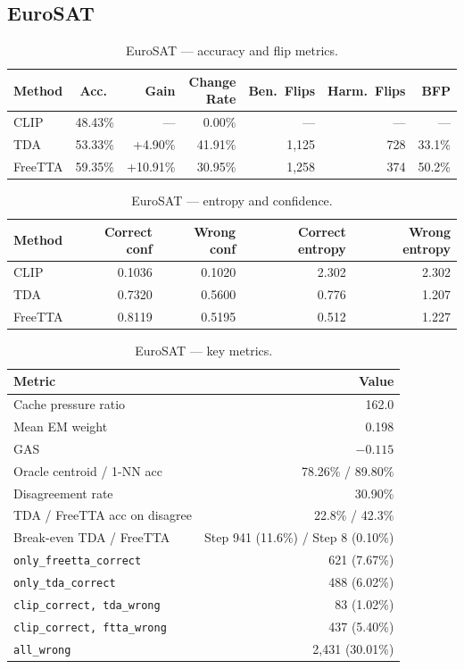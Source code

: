\documentclass[12pt,a4paper]{article}
\newcommand{\1}{\mathbf{1}}
\begin{document}
\subsection{EuroSAT}

\begin{table}[H]
\centering
\caption{EuroSAT --- accuracy and flip metrics.}
\label{tab:eurosat_flip}
\begin{tabular}{@{}lrrrrrr@{}}
\toprule
Method & Acc.\ & Gain & Change Rate & Ben.\ Flips & Harm.\ Flips & BFP \\
\midrule
CLIP    & 48.43\% & ---     & 0.00\%  & ---   & ---  & --- \\
TDA     & 53.33\% & +4.90\% & 41.91\% & 1,125 & 728  & 33.1\% \\
FreeTTA & 59.35\% & +10.91\% & 30.95\% & 1,258 & 374  & 50.2\% \\
\bottomrule
\end{tabular}
\end{table}

\begin{table}[H]
\centering
\caption{EuroSAT --- entropy and confidence.}
\label{tab:eurosat_entropy}
\begin{tabular}{@{}lrrrr@{}}
\toprule
Method & Correct conf & Wrong conf & Correct entropy & Wrong entropy \\
\midrule
CLIP    & 0.1036 & 0.1020 & 2.302 & 2.302 \\
TDA     & 0.7320 & 0.5600 & 0.776 & 1.207 \\
FreeTTA & 0.8119 & 0.5195 & 0.512 & 1.227 \\
\bottomrule
\end{tabular}
\end{table}

\begin{table}[H]
\centering
\caption{EuroSAT --- key metrics.}
\label{tab:eurosat_internal}
\begin{tabular}{@{}lr@{}}
\toprule
Metric & Value \\
\midrule
Cache pressure ratio         & 162.0 \\
Mean EM weight               & 0.198 \\
GAS                          & $-0.115$ \\
Oracle centroid / 1-NN acc   & 78.26\% / 89.80\% \\
Disagreement rate            & 30.90\% \\
TDA / FreeTTA acc on disagree & 22.8\% / 42.3\% \\
Break-even TDA / FreeTTA     & Step 941 (11.6\%) / Step 8 (0.10\%) \\
\texttt{only\_freetta\_correct} & 621 (7.67\%) \\
\texttt{only\_tda\_correct}     & 488 (6.02\%) \\
\texttt{clip\_correct, tda\_wrong} & 83 (1.02\%) \\
\texttt{clip\_correct, ftta\_wrong} & 437 (5.40\%) \\
\texttt{all\_wrong}             & 2,431 (30.01\%) \\
\bottomrule
\end{tabular}
\end{table}
\end{document}

